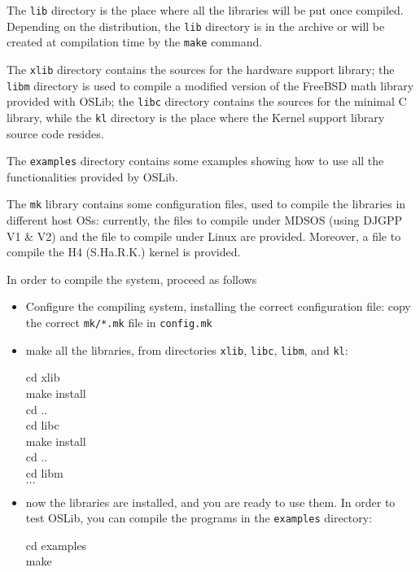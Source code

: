 \documentclass[a4paper]{report}
\begin{document}
The {\tt lib} directory is the place where all the libraries
will be put once compiled. Depending on the
distribution, the {\tt lib} directory is in the archive or will be
created at compilation time by the {\tt make} command.

The {\tt xlib} directory contains the sources for the hardware
support  library; the {\tt libm} directory is used to compile a
modified version of the FreeBSD math library provided with OSLib; the 
{\tt libc} directory contains the sources for the minimal C library, 
while the {\tt kl} directory is the place where the Kernel support library
source code resides.

The {\tt examples} directory contains some examples
showing how to use all the functionalities provided by OSLib.

The {\tt mk} library contains some configuration files, used to
compile the libraries in different host OSs: currently, the files
to compile under MDSOS (using DJGPP V1 \& V2) and the file to compile
under Linux are provided. Moreover, a file to compile the H4 (S.Ha.R.K.)
kernel is provided.

In order to compile the system, proceed as follows
\begin{itemize}
	\item Configure the compiling system, installing the 
		correct configuration file: copy the correct {\tt mk/*.mk}
		file in {\tt config.mk}
	\item make all the libraries, from directories {\tt xlib}, 
		{\tt libc}, {\tt libm}, and {\tt kl}:
		
		\begin{minipage}[t]{10cm}
		\begin{tt}
		\begin{tabbing}
		cd xlib					\\
		make install				\\
		cd ..					\\
		cd libc					\\
		make install				\\
		cd ..					\\
		cd libm					\\
		$\ldots$
		\end{tabbing}
		\end{tt}
		\end{minipage}
	\item now the libraries are installed, and you are ready to
		use them. In order to test OSLib, you can compile
		the programs in the {\tt examples} directory:

		\begin{minipage}[t]{10cm}
		\begin{tt}
		\begin{tabbing}
		cd examples				\\
		make
		\end{tabbing}
		\end{tt}
		\end{minipage}
\end{itemize}
\end{document}
